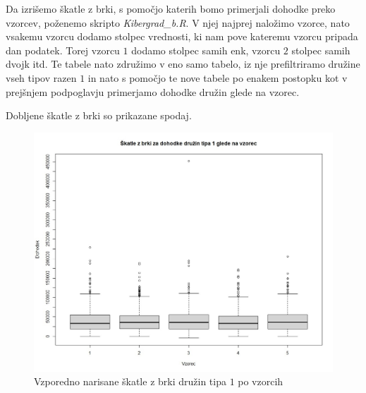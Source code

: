 \documentclass[a4paper, 10pt]{article}
\begin{document}
	Da izrišemo škatle z brki, s pomočjo katerih bomo primerjali dohodke preko vzorcev, poženemo skripto \textit{Kibergrad\_b.R}. V njej najprej naložimo vzorce, nato vsakemu vzorcu dodamo stolpec vrednosti, ki nam pove kateremu vzorcu pripada dan podatek. Torej vzorcu $1$ dodamo stolpec samih enk, vzorcu $2$ stolpec samih dvojk itd. Te tabele nato združimo v eno samo tabelo, iz nje prefiltriramo družine vseh tipov razen $1$ in nato s pomočjo te nove tabele po enakem postopku kot v prejšnjem podpoglavju primerjamo dohodke družin glede na vzorec.

	Dobljene škatle z brki so prikazane spodaj.

	\begin{figure}[h!]
		\label{fig: boxplotB1}
		\centering
		\includegraphics[scale = 0.425]{SkatlezbrkiB}
		\caption{Vzporedno narisane škatle z brki družin tipa $1$ po vzorcih}
	\end{figure}
\end{document}
